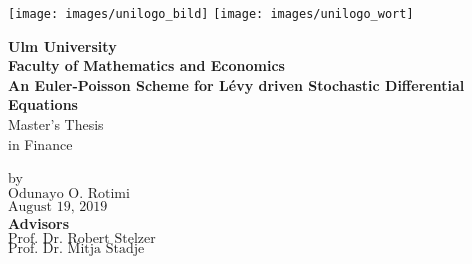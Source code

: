 \documentclass[oneside, 12pt]{scrreprt}
\begin{document}



\begin{titlepage}
\texttt{[image: images/unilogo\_bild]}
\hfill
\texttt{[image: images/unilogo\_wort]}\\[1em]

\thispagestyle{empty}
\textwidth28cm
\begin{center}
{\Large\bfseries Ulm University\\
   Faculty of Mathematics and Economics\\
}
\vspace{3cm}
{\LARGE\bfseries
An Euler-Poisson Scheme for L\'evy driven Stochastic Differential Equations
\\
}
\vspace{1cm}
{\Large
Master's Thesis} \\
\bigskip %
{\Large in Finance}
\end{center}
\vspace{1.5cm}
\begin{center}
by \\
$\mbox{Odunayo O. Rotimi}$ \\
$\mbox{August 19, 2019}$\\

\vspace*{1.2cm}
\textbf{ Advisors} \\

$\mbox{Prof. Dr. Robert Stelzer}$\\
$\mbox{Prof. Dr. Mitja Stadje}$
\end{center}
\vfill
\end{titlepage}
${ }$
\let\cleardoublepage\clearpage

 
\end{document}
